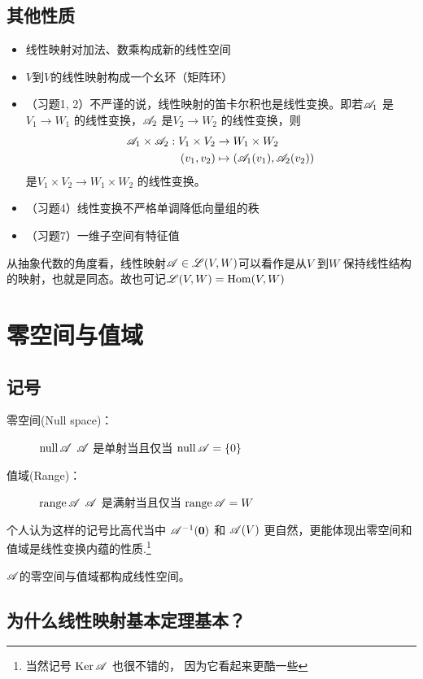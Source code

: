 \subsection{其他性质}
\begin{itemize}
    \item 线性映射对加法、数乘构成新的线性空间
    \item \(V\)到\(V\)的线性映射构成一个幺环（矩阵环）
    \item （习题1, 2）不严谨的说，线性映射的笛卡尔积也是线性变换。即若\(\mathscr{A}_{1}\)
        是\(V_{1} \to W_{1}\) 的线性变换，\(\mathscr{A}_{2}\)
        是\(V_{2} \to W_{2}\) 的线性变换，则
        \begin{align*}
            \mathscr{A}_{1} \times \mathscr{A}_{2} : V_{1}
            \times V_{2} &\to W_{1} \times W_{2}\\
            (v_{1},v_{2}) &\mapsto
            (\mathscr{A}_{1}(v_{1}),\mathscr{A}_{2}(v_{2}))
        \end{align*}
        是\(V_{1} \times V_{2} \to
        W_{1} \times W_{2}\) 的线性变换。
    \item （习题4）线性变换不严格单调降低向量组的秩
    \item （习题7）一维子空间有特征值
\end{itemize}

从抽象代数的角度看，线性映射\(\mathscr{A} \in \mathscr{L}(V,W)\)可以看作是从\(V\) 到\(W\)
保持线性结构的映射，也就是同态。故也可记\(\mathscr{L}(V,W)=\operatorname{Hom}(V,W)\)

\section{零空间与值域}
\subsection{记号}
\begin{description}
    \item[零空间(Null space)：] \(\operatorname{null} \mathscr{A}\)
        \(\mathscr{A}\) 是单射当且仅当
        \(\operatorname{null} \mathscr{A} = \{0\}\)
    \item[值域(Range)：] \(\operatorname{range} \mathscr{A}\)
        \(\mathscr{A}\) 是满射当且仅当
        \(\operatorname{range} \mathscr{A} = W\)
\end{description}
个人认为这样的记号比高代当中 \(\mathscr{A}^{-1}(\bm{0})\) 和 \(\mathscr{A}(V)\)
更自然，更能体现出零空间和值域是线性变换内蕴的性质.\footnote{当然记号
    \(\operatorname{Ker} \mathscr{A}\) 也很不错的，
因为它看起来更酷一些 }

\(\mathscr{A}\)的零空间与值域都构成线性空间。

\subsection{为什么线性映射基本定理基本？}

